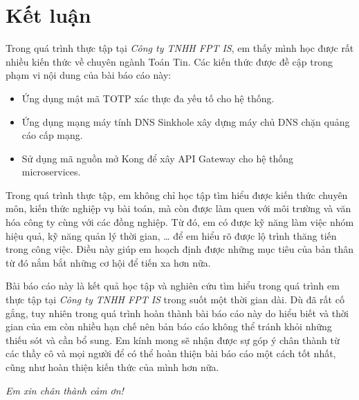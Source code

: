 

\newpage
{\centering \section*{Kết luận}}

Trong quá trình thực tập tại
\textit{Công ty TNHH FPT IS},
em thấy mình học được rất nhiều kiến thức
về chuyên ngành Toán Tin.
Các kiến thức được đề cập trong phạm vi nội dung của bài báo cáo này:

\begin{itemize}

    \item Ứng dụng mật mã TOTP xác thực đa yếu tố cho hệ thống.
    \item Ứng dụng mạng máy tính DNS Sinkhole xây dựng máy chủ DNS chặn quảng cáo cấp mạng.
    \item Sử dụng mã nguồn mở Kong để xây API Gateway cho hệ thống microservices.
\end{itemize}

Trong quá trình thực tập,
em
không chỉ học tập tìm hiểu được kiến thức chuyên môn,
kiến thức nghiệp vụ bài toán,
mà
còn được làm quen với môi trường và văn hóa công ty
cùng với các đồng nghiệp.
Từ đó, em có được
kỹ năng
làm việc nhóm hiệu quả,
kỹ năng
quản lý thời gian, \dots
để
em
hiểu rõ được lộ trình
thăng tiến trong công việc.
Điều này giúp em hoạch định
được những mục tiêu của bản thân
từ đó nắm bắt những cơ hội để tiến xa hơn nữa.

Bài báo cáo này là kết quả học tập và nghiên cứu tìm hiểu trong quá trình
em thực tập tại
\textit{Công ty TNHH FPT IS}
trong suốt một thời gian dài.
Dù đã rất cố gắng,
tuy nhiên
trong quá trình hoàn thành bài báo cáo này
do hiểu biết và thời gian của em còn nhiều hạn chế
nên bản báo cáo không thể tránh khỏi những thiếu sót và cần bổ sung.
Em kính mong sẽ nhận được sự góp ý chân thành
từ các thầy cô và mọi người
để có thể hoàn thiện
bài báo cáo một cách tốt nhất,
cũng như hoàn thiện kiến thức của mình hơn nữa.

\vspace{0.5cm} \emph{Em xin chân thành cảm ơn!}
